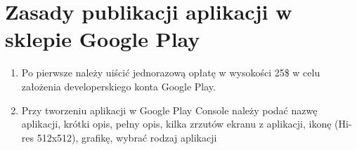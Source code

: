 \documentclass[12pt, a4paper]{article}
\begin{document}
\section{Zasady publikacji aplikacji w sklepie Google Play}
\begin{enumerate}
\item Po pierwsze należy uiścić jednorazową opłatę w wysokości 25\$ w celu założenia developerskiego konta Google Play.
\item Przy tworzeniu aplikacji w Google Play Console należy podać nazwę aplikacji, krótki opis, pełny opis, kilka zrzutów ekranu z aplikacji, ikonę (Hi-res 512x512), grafikę, wybrać rodzaj aplikacji
\end{enumerate}
\end{document}
